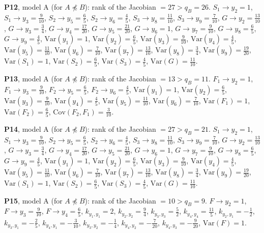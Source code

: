\documentclass[10pt,a4paper]{article}
\newcommand{\nnest}{\not\preceq}
\begin{document}
{\noindent\textbf{P12}, model A (for $A\nnest B$): rank of the Jacobian $=27>q_B=26$. {\footnotesize $S_{1}\to y_{2}=1$, $S_{1}\to y_{3}=\tfrac{9}{10}$, $S_{2}\to y_{5}=\tfrac{6}{5}$, $S_{2}\to y_{6}=\tfrac{4}{5}$, $S_{3}\to y_{8}=\tfrac{11}{10}$, $S_{3}\to y_{9}=\tfrac{7}{10}$, $G\to y_{2}=\tfrac{13}{10}$, $G\to y_{3}=\tfrac{3}{4}$, $G\to y_{4}=\tfrac{17}{20}$, $G\to y_{5}=\tfrac{21}{20}$, $G\to y_{6}=1$, $G\to y_{7}=\tfrac{9}{10}$, $G\to y_{8}=\tfrac{6}{5}$, $G\to y_{9}=\tfrac{4}{5}$, $\mathrm{Var}(y_{1})=1$, $\mathrm{Var}(y_{2})=\tfrac{6}{5}$, $\mathrm{Var}(y_{3})=\tfrac{9}{10}$, $\mathrm{Var}(y_{4})=\tfrac{4}{5}$, $\mathrm{Var}(y_{5})=\tfrac{11}{10}$, $\mathrm{Var}(y_{6})=\tfrac{7}{10}$, $\mathrm{Var}(y_{7})=\tfrac{13}{10}$, $\mathrm{Var}(y_{8})=\tfrac{3}{4}$, $\mathrm{Var}(y_{9})=\tfrac{19}{20}$, $\mathrm{Var}(S_{1})=1$, $\mathrm{Var}(S_{2})=\tfrac{6}{5}$, $\mathrm{Var}(S_{3})=\tfrac{4}{5}$, $\mathrm{Var}(G)=\tfrac{11}{10}$.}\par\smallskip
\noindent\textbf{P13}, model A (for $A\nnest B$): rank of the Jacobian $=13>q_B=11$. {\footnotesize $F_{1}\to y_{2}=1$, $F_{1}\to y_{3}=\tfrac{9}{10}$, $F_{2}\to y_{5}=\tfrac{6}{5}$, $F_{2}\to y_{6}=\tfrac{4}{5}$, $\mathrm{Var}(y_{1})=1$, $\mathrm{Var}(y_{2})=\tfrac{6}{5}$, $\mathrm{Var}(y_{3})=\tfrac{9}{10}$, $\mathrm{Var}(y_{4})=\tfrac{4}{5}$, $\mathrm{Var}(y_{5})=\tfrac{11}{10}$, $\mathrm{Var}(y_{6})=\tfrac{7}{10}$, $\mathrm{Var}(F_{1})=1$, $\mathrm{Var}(F_{2})=\tfrac{6}{5}$, $\mathrm{Cov}(F_{2},F_{1})=\tfrac{3}{10}$.}\par\smallskip
\noindent\textbf{P14}, model A (for $A\nnest B$): rank of the Jacobian $=27>q_B=21$. {\footnotesize $S_{1}\to y_{2}=1$, $S_{1}\to y_{3}=\tfrac{9}{10}$, $S_{2}\to y_{5}=\tfrac{6}{5}$, $S_{2}\to y_{6}=\tfrac{4}{5}$, $S_{3}\to y_{8}=\tfrac{11}{10}$, $S_{3}\to y_{9}=\tfrac{7}{10}$, $G\to y_{2}=\tfrac{13}{10}$, $G\to y_{3}=\tfrac{3}{4}$, $G\to y_{4}=\tfrac{17}{20}$, $G\to y_{5}=\tfrac{21}{20}$, $G\to y_{6}=1$, $G\to y_{7}=\tfrac{9}{10}$, $G\to y_{8}=\tfrac{6}{5}$, $G\to y_{9}=\tfrac{4}{5}$, $\mathrm{Var}(y_{1})=1$, $\mathrm{Var}(y_{2})=\tfrac{6}{5}$, $\mathrm{Var}(y_{3})=\tfrac{9}{10}$, $\mathrm{Var}(y_{4})=\tfrac{4}{5}$, $\mathrm{Var}(y_{5})=\tfrac{11}{10}$, $\mathrm{Var}(y_{6})=\tfrac{7}{10}$, $\mathrm{Var}(y_{7})=\tfrac{13}{10}$, $\mathrm{Var}(y_{8})=\tfrac{3}{4}$, $\mathrm{Var}(y_{9})=\tfrac{19}{20}$, $\mathrm{Var}(S_{1})=1$, $\mathrm{Var}(S_{2})=\tfrac{6}{5}$, $\mathrm{Var}(S_{3})=\tfrac{4}{5}$, $\mathrm{Var}(G)=\tfrac{11}{10}$.}\par\smallskip
\noindent\textbf{P15}, model A (for $A\nnest B$): rank of the Jacobian $=10>q_B=9$. {\footnotesize $F\to y_{2}=1$, $F\to y_{3}=\tfrac{9}{10}$, $F\to y_{4}=\tfrac{6}{5}$, $k_{y_{1},y_{1}}=2$, $k_{y_{2},y_{2}}=\tfrac{9}{4}$, $k_{y_{3},y_{3}}=\tfrac{5}{2}$, $k_{y_{4},y_{4}}=\tfrac{11}{5}$, $k_{y_{2},y_{1}}=-\tfrac{1}{2}$, $k_{y_{3},y_{1}}=-\tfrac{2}{5}$, $k_{y_{4},y_{1}}=-\tfrac{3}{10}$, $k_{y_{3},y_{2}}=-\tfrac{1}{4}$, $k_{y_{4},y_{2}}=-\tfrac{7}{20}$, $k_{y_{4},y_{3}}=-\tfrac{9}{20}$, $\mathrm{Var}(F)=1$.}\par\smallskip
}
\end{document}
